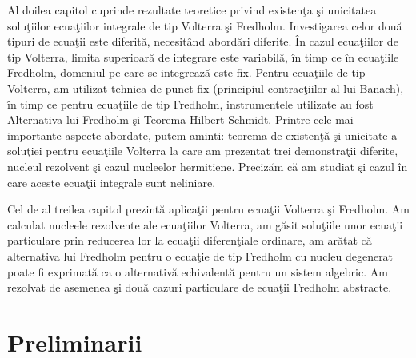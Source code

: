 \documentclass[a4paper,12pt,oneside]{report}
\begin{document}
Al doilea capitol cuprinde rezultate teoretice privind existen\c{t}a \c{s}i unicitatea solu\c{t}iilor ecua\c{t}iilor integrale de tip Volterra \c{s}i Fredholm. Investigarea celor dou\u{a} tipuri de ecua\c{t}ii este diferit\u{a}, necesit\^{a}nd abord\u{a}ri diferite. \^{I}n cazul ecua\c{t}iilor de tip Volterra, limita superioar\u{a} de integrare este variabil\u{a}, \^{i}n timp ce \^{i}n ecua\c{t}iile Fredholm, domeniul pe care se integreaz\u{a} este fix. Pentru ecua\c{t}iile de tip Volterra, am utilizat tehnica de punct fix (principiul contrac\c{t}iilor al lui Banach), \^{i}n timp ce pentru ecua\c{t}iile de tip Fredholm, instrumentele utilizate au fost Alternativa lui Fredholm \c{s}i Teorema Hilbert-Schmidt.
Printre cele mai importante aspecte abordate, putem aminti: teorema de existen\c{t}\u{a} \c{s}i unicitate a solu\c{t}iei pentru ecua\c{t}iile Volterra la care am prezentat trei demonstra\c{t}ii diferite, nucleul rezolvent \c{s}i cazul nucleelor hermitiene. Preciz\u{a}m c\u{a} am studiat \c{s}i cazul \^{i}n care aceste ecua\c{t}ii integrale sunt neliniare.

Cel de al treilea capitol prezint\u{a} aplica\c{t}ii pentru ecua\c{t}ii  Volterra \c{s}i Fredholm. Am calculat nucleele rezolvente ale ecua\c{t}iilor Volterra,  am g\u{a}sit solu\c{t}iile unor ecua\c{t}ii particulare prin reducerea lor la ecua\c{t}ii diferen\c{t}iale ordinare, am ar\u{a}tat c\u{a} alternativa lui Fredholm pentru o ecua\c{t}ie de tip Fredholm cu nucleu degenerat poate fi exprimat\u{a} ca o alternativ\u{a} echivalent\u{a} pentru un sistem algebric. Am rezolvat de asemenea \c{s}i dou\u{a} cazuri particulare de ecua\c{t}ii Fredholm abstracte.



%
%
%
%

\chapter{Preliminarii}

\nocite{morosanu}
\nocite{kreyszig}
\end{document}
